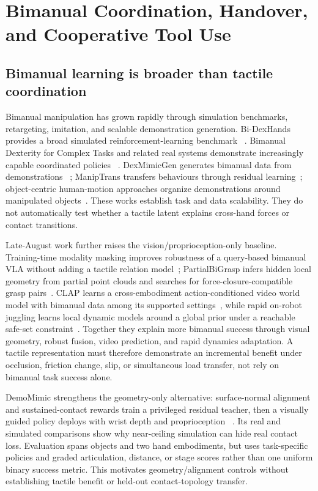 \section{Bimanual Coordination, Handover, and Cooperative Tool Use}
\label{sec:bimanual}

\subsection{Bimanual learning is broader than tactile coordination}

Bimanual manipulation has grown rapidly through simulation benchmarks,
retargeting, imitation, and scalable demonstration generation. Bi-DexHands
provides a broad simulated reinforcement-learning benchmark
~\cite{chen2022bidexhands}. Bimanual Dexterity for Complex Tasks and related real
systems demonstrate increasingly capable coordinated policies
~\cite{shaw2024bidex}. DexMimicGen generates bimanual data from demonstrations
~\cite{jiang2024dexmimicgen}; ManipTrans transfers behaviours through residual
learning~\cite{li2025maniptrans}; object-centric human-motion approaches organize
demonstrations around manipulated objects~\cite{chen2024objectcentric}. These
works establish task and data scalability. They do not automatically test whether
a tactile latent explains cross-hand forces or contact transitions.

Late-August work further raises the vision/proprioception-only baseline.
Training-time modality masking improves robustness of a query-based bimanual VLA
without adding a tactile relation model~\cite{cheng2026modalitymasking};
PartialBiGrasp infers hidden local geometry from partial point clouds and searches
for force-closure-compatible grasp pairs~\cite{kaura2026partialbigrasp}. CLAP
learns a cross-embodiment action-conditioned video world model with bimanual data
among its supported settings~\cite{liu2026clap}, while rapid on-robot juggling
learns local dynamic models around a global prior under a reachable safe-set
constraint~\cite{lee2026robotjuggling}. Together they explain more bimanual
success through visual geometry, robust fusion, video prediction, and rapid
dynamics adaptation. A tactile representation must therefore demonstrate an
incremental benefit under occlusion, friction change, slip, or simultaneous load
transfer, not rely on bimanual task success alone.

DemoMimic strengthens the geometry-only alternative: surface-normal alignment
and sustained-contact rewards train a privileged residual teacher, then a
visually guided policy deploys with wrist depth and proprioception
~\cite{sharma2026demomimic}. Its real and simulated comparisons show why
near-ceiling simulation can hide real contact loss. Evaluation spans objects and
two hand embodiments, but uses task-specific policies and graded articulation,
distance, or stage scores rather than one uniform binary success metric. This
motivates geometry/alignment controls without establishing tactile benefit or
held-out contact-topology transfer.

